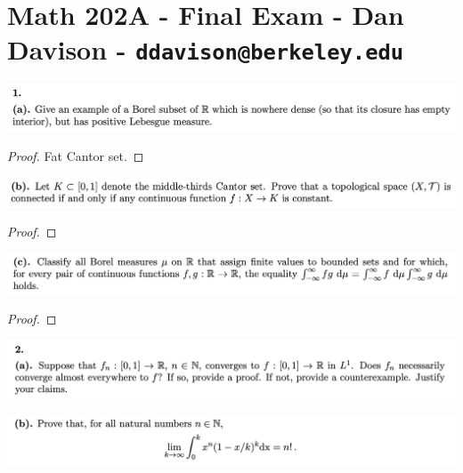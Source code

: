 \section*{Math 202A - Final Exam - Dan Davison - \texttt{ddavison@berkeley.edu}}

\begin{mdframed}
\includegraphics[width=400pt]{img/analysis--berkeley-202a-final-c9d2.png}
\end{mdframed}

\begin{proof}
  Fat Cantor set.
\end{proof}

\begin{mdframed}
\includegraphics[width=400pt]{img/analysis--berkeley-202a-final-4333.png}
\end{mdframed}

\begin{proof}
\end{proof}

\begin{mdframed}
\includegraphics[width=400pt]{img/analysis--berkeley-202a-final-0bf8.png}
\end{mdframed}

\begin{proof}
\end{proof}

\newpage
\begin{mdframed}
\includegraphics[width=400pt]{img/analysis--berkeley-202a-final-04b9.png}
\end{mdframed}

\begin{mdframed}
\includegraphics[width=400pt]{img/analysis--berkeley-202a-final-96cc.png}
\end{mdframed}

